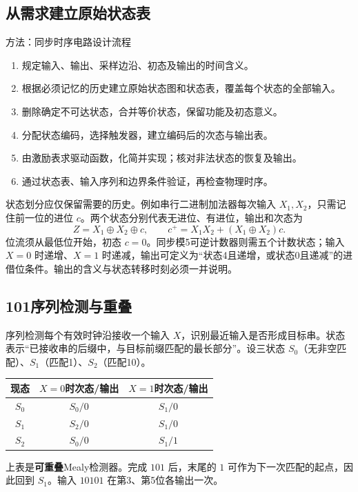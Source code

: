 \documentclass[UTF8,fontset=none,zihao=-4,a4paper]{ctexart}
\newcommand{\term}[1]{\textbf{#1}}
\begin{document}
\subsection{从需求建立原始状态表}
\begin{infobox}{方法：同步时序电路设计流程}
\begin{enumerate}
\item 规定输入、输出、采样边沿、初态及输出的时间含义。
\item 根据必须记忆的历史建立原始状态图和状态表，覆盖每个状态的全部输入。
\item 删除确定不可达状态，合并等价状态，保留功能及初态意义。
\item 分配状态编码，选择触发器，建立编码后的次态与输出表。
\item 由激励表求驱动函数，化简并实现；核对非法状态的恢复及输出。
\item 通过状态表、输入序列和边界条件验证，再检查物理时序。
\end{enumerate}
\end{infobox}
状态划分应仅保留需要的历史。例如串行二进制加法器每次输入 $X_1,X_2$，只需记住前一位的进位 $c$。两个状态分别代表无进位、有进位，输出和次态为
\[
Z=X_1\oplus X_2\oplus c,\qquad c^+=X_1X_2+(X_1\oplus X_2)c.
\]
位流须从最低位开始，初态 $c=0$。同步模5可逆计数器则需五个计数状态；输入 $X=0$ 时递增、$X=1$ 时递减，输出可定义为“状态4且递增，或状态0且递减”的进借位条件。输出的含义与状态转移时刻必须一并说明。

\subsection{101序列检测与重叠}
序列检测每个有效时钟沿接收一个输入 $X$，识别最近输入是否形成目标串。状态表示“已接收串的后缀中，与目标前缀匹配的最长部分”。设三状态 $S_0$（无非空匹配）、$S_1$（匹配1）、$S_2$（匹配10）。
\begin{center}
\begin{tabular}{c cc}
\toprule 现态 & $X=0$时次态/输出 & $X=1$时次态/输出\\\midrule
$S_0$&$S_0/0$&$S_1/0$\\
$S_1$&$S_2/0$&$S_1/0$\\
$S_2$&$S_0/0$&$S_1/1$\\\bottomrule
\end{tabular}
\end{center}
上表是\term{可重叠}Mealy检测器。完成 $101$ 后，末尾的 $1$ 可作为下一次匹配的起点，因此回到 $S_1$。输入 $10101$ 在第3、第5位各输出一次。
\end{document}
